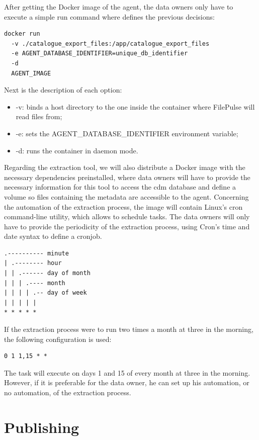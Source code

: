 After getting the Docker image of the agent, the data owners only have to execute a simple run command where defines the previous decisions:

\begin{verbatim}
docker run
  -v ./catalogue_export_files:/app/catalogue_export_files
  -e AGENT_DATABASE_IDENTIFIER=unique_db_identifier
  -d
  AGENT_IMAGE
\end{verbatim}

Next is the description of each option:
\begin{itemize}
    \item -v: binds a host directory to the one inside the container where FilePulse will read files from;
    \item -e: sets the AGENT\_DATABASE\_IDENTIFIER environment variable;
    \item -d: runs the container in daemon mode.
\end{itemize}

Regarding the extraction tool, we will also distribute a Docker image with the necessary dependencies preinstalled, where data owners will have to provide the necessary information for this tool to access the \gls{cdm} database and define a volume so files containing the metadata are accessible to the agent.
Concerning the automation of the extraction process, the image will contain Linux's cron command-line utility, which allows to schedule tasks.
The data owners will only have to provide the periodicity of the extraction process, using Cron's time and date syntax to define a cronjob.
\begin{verbatim}
.---------- minute
| .-------- hour
| | .------ day of month
| | | .---- month
| | | | .-- day of week
| | | | |
* * * * *
\end{verbatim}
If the extraction process were to run two times a month at three in the morning, the following configuration is used:
\begin{verbatim}
0 1 1,15 * *
\end{verbatim}
The task will execute on days 1 and 15 of every month at three in the morning.
However, if it is preferable for the data owner, he can set up his automation, or no automation, of the extraction process.

\section{Publishing}

